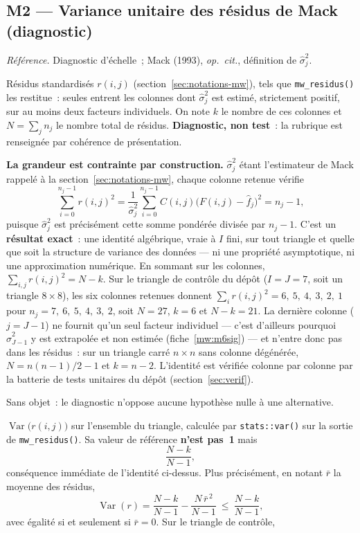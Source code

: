 \documentclass[a4paper,11pt]{article}
\newcommand{\code}[1]{\texttt{\small #1}}
\newcommand{\refl}[1]{{\small\textcolor{maincolor!70!black}{\textit{Référence.} #1}}\par\smallskip}
\newcounter{ficheid}
\newenvironment{fiche}[1]{%
  \stepcounter{ficheid}%
  \phantomsection
  \subsection{#1}%
  \label{fiche:\theficheid}%
}{%
  \end{description}\vspace{0.5em}%
}
\newcommand{\Cadre}{%
  \begin{description}[leftmargin=0pt, style=unboxed, itemsep=3pt, topsep=3pt, parsep=2pt]%
  \item[\textcolor{financeblue}{\textbf{1. Cadre, notations et hypothèses de validité (non testées).}}]}
\newcommand{\Hzero}{\item[\textcolor{financeblue}{\textbf{2. Hypothèse nulle.}}]}
\newcommand{\Stat}{\item[\textcolor{financeblue}{\textbf{3. Statistique de test.}}]}
\begin{document}
\begin{fiche}{M2 --- Variance unitaire des résidus de Mack (diagnostic)}
\label{mw:m2var}
\refl{Diagnostic d'échelle~; Mack (1993), \emph{op.\ cit.}, définition de
$\hat\sigma_j^2$.}
\Cadre
Résidus standardisés $r(i,j)$ (section~\ref{sec:notations-mw}), tels que
\code{mw\_residus()} les restitue~: seules entrent les colonnes dont
$\hat\sigma_j^2$ est estimé, strictement positif, sur au moins deux facteurs
individuels. On note $k$ le nombre de ces colonnes et $N = \sum_j n_j$ le nombre
total de résidus. \textbf{Diagnostic, non test}~: la rubrique est renseignée par
cohérence de présentation.

\textbf{La grandeur est contrainte par construction.} $\hat\sigma_j^2$ étant
l'estimateur de Mack rappelé à la section~\ref{sec:notations-mw}, chaque colonne
retenue vérifie
\[
  \sum_{i=0}^{n_j-1} r(i,j)^2
  = \frac{1}{\hat\sigma_j^2}\sum_{i=0}^{n_j-1}
    C(i,j)\big(F(i,j) - \hat f_j\big)^2
  = n_j - 1 ,
\]
puisque $\hat\sigma_j^2$ est précisément cette somme pondérée divisée par
$n_j - 1$. C'est un \textbf{résultat exact}~: une identité algébrique, vraie à
$I$ fini, sur tout triangle et quelle que soit la structure de variance des
données --- ni une propriété asymptotique, ni une approximation numérique. En
sommant sur les colonnes, $\sum_{i,j} r(i,j)^2 = N - k$. Sur le triangle de
contrôle du dépôt ($I = J = 7$, soit un triangle $8\times8$), les six colonnes
retenues donnent $\sum_i r(i,j)^2 = 6,\ 5,\ 4,\ 3,\ 2,\ 1$ pour
$n_j = 7,\ 6,\ 5,\ 4,\ 3,\ 2$,
soit $N = 27$, $k = 6$ et $N - k = 21$. La dernière colonne ($j = J-1$) ne
fournit qu'un seul facteur individuel --- c'est d'ailleurs pourquoi
$\hat\sigma^2_{J-1}$ y est extrapolée et non estimée (fiche~\ref{mw:m6sig}) ---
et n'entre donc pas dans les résidus~: sur un triangle carré $n\times n$ sans
colonne dégénérée, $N = n(n-1)/2 - 1$ et $k = n-2$. L'identité est vérifiée
colonne par colonne par la batterie de tests unitaires du dépôt
(section~\ref{sec:verif}).
\Hzero
Sans objet~: le diagnostic n'oppose aucune hypothèse nulle à une alternative.
\Stat
$\operatorname{Var}\big(r(i,j)\big)$ sur l'ensemble du triangle, calculée par
\code{stats::var()} sur la sortie de \code{mw\_residus()}. Sa valeur de référence
\textbf{n'est pas~1} mais
\[
  \frac{N-k}{N-1},
\]
conséquence immédiate de l'identité ci-dessus. Plus précisément, en notant
$\bar r$ la moyenne des résidus,
\[
  \operatorname{Var}(r) = \frac{N-k}{N-1}
  - \frac{N\,\bar r^{\,2}}{N-1}
  \ \le\ \frac{N-k}{N-1} ,
\]
avec égalité si et seulement si $\bar r = 0$. Sur le triangle de contrôle,

\end{fiche}
\end{document}
